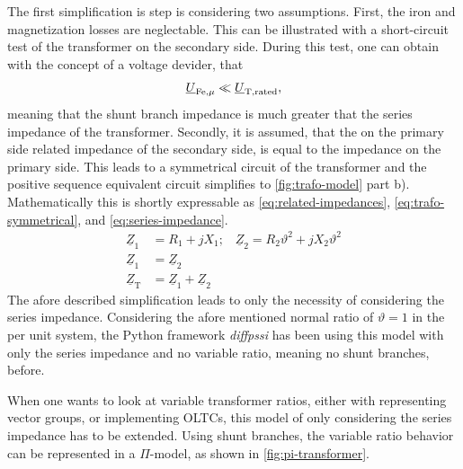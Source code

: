 The first simplification is step is considering two assumptions. First, the iron and magnetization losses are neglectable. This can be illustrated with a short-circuit test of the transformer on the secondary side. During this test, one can obtain with the concept of a voltage devider, that
\begin{align}
    \underline{U}_\mathrm{Fe, \mu} \ll \underline{U}_\mathrm{T,rated}, \notag
\end{align}
meaning that the shunt branch impedance is much greater that the series impedance of the transformer. Secondly, it is assumed, that the on the primary side related impedance of the secondary side, is equal to the impedance on the primary side. This leads to a symmetrical circuit of the transformer and the positive sequence equivalent circuit simplifies to \autoref{fig:trafo-model} part b). Mathematically this is shortly expressable as \autoref{eq:related-impedances}, \autoref{eq:trafo-symmetrical}, and \autoref{eq:series-impedance}. \autocite{machowskiPowerSystemDynamics2020,kundurPowerSystemStability2022,milanoPowerSystemModelling2010}
\begin{align}
    \underline{Z}_1 &= R_1 + jX_1\text{;}\quad\underline{Z}_2 = R_2 \vartheta^2 + jX_2 \vartheta^2 \label{eq:related-impedances} \\
    \underline{Z}_1 &= \underline{Z}_2 \label{eq:trafo-symmetrical} \\
    \underline{Z}_\mathrm{T} &= \underline{Z}_1 + \underline{Z}_2 \label{eq:series-impedance}
\end{align}
The afore described simplification leads to only the necessity of considering the series impedance. Considering the afore mentioned normal ratio of $\vartheta=1$ in the per unit system, the Python framework \textit{diffpssi} has been using this model with only the series impedance and no variable ratio, meaning no shunt branches, before.

When one wants to look at variable transformer ratios, either with representing vector groups, or implementing \acfp{OLTC}, this model of only considering the series impedance has to be extended. Using shunt branches, the variable ratio behavior can be represented in a $\Pi$-model, as shown in \autoref{fig:pi-transformer}. \autocite{machowskiPowerSystemDynamics2020,kundurPowerSystemStability2022,milanoPowerSystemModelling2010}

